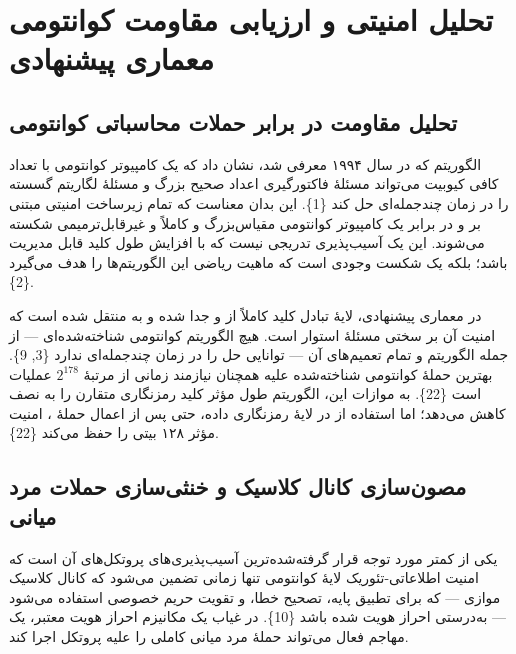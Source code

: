 \documentclass[a4paper,14pt]{extreport}
\begin{document}
\section{تحلیل امنیتی و ارزیابی مقاومت کوانتومی معماری پیشنهادی}

\subsection{تحلیل مقاومت در برابر حملات محاسباتی کوانتومی}

الگوریتم  که در سال ۱۹۹۴ معرفی شد، نشان داد که یک کامپیوتر کوانتومی با تعداد کافی کیوبیت می‌تواند مسئلهٔ فاکتورگیری اعداد صحیح بزرگ و مسئلهٔ لگاریتم گسسته را در زمان چندجمله‌ای  حل کند \{1\}. این بدان معناست که تمام زیرساخت امنیتی مبتنی بر  و  در برابر یک کامپیوتر کوانتومی مقیاس‌بزرگ و  کاملاً و غیرقابل‌ترمیمی شکسته می‌شوند. این یک آسیب‌پذیری تدریجی نیست که با افزایش طول کلید قابل مدیریت باشد؛ بلکه یک شکست وجودی  است که ماهیت ریاضی این الگوریتم‌ها را هدف می‌گیرد \{2\}.

در معماری پیشنهادی، لایهٔ تبادل کلید کاملاً از  و  جدا شده و به  منتقل شده است که امنیت آن بر سختی مسئلهٔ  استوار است. هیچ الگوریتم کوانتومی شناخته‌شده‌ای --- از جمله الگوریتم  و تمام تعمیم‌های آن --- توانایی حل  را در زمان چندجمله‌ای ندارد \{3, 9\}. بهترین حملهٔ کوانتومی شناخته‌شده علیه  همچنان نیازمند زمانی از مرتبهٔ $2^{178}$ عملیات است \{22\}. به موازات این، الگوریتم  طول مؤثر کلید رمزنگاری متقارن را به نصف کاهش می‌دهد؛ اما استفاده از  در لایهٔ رمزنگاری داده، حتی پس از اعمال حملهٔ ، امنیت مؤثر ۱۲۸ بیتی را حفظ می‌کند \{22\}.

\subsection{مصون‌سازی کانال کلاسیک  و خنثی‌سازی حملات مرد میانی}

یکی از کمتر مورد توجه قرار گرفته‌شده‌ترین آسیب‌پذیری‌های پروتکل‌های  آن است که امنیت اطلاعاتی-تئوریک لایهٔ کوانتومی تنها زمانی تضمین می‌شود که کانال کلاسیک موازی --- که برای تطبیق پایه، تصحیح خطا، و تقویت حریم خصوصی استفاده می‌شود --- به‌درستی احراز هویت شده باشد \{10\}. در غیاب یک مکانیزم احراز هویت معتبر، یک مهاجم فعال می‌تواند حملهٔ مرد میانی  کاملی را علیه پروتکل  اجرا کند.
\end{document}

